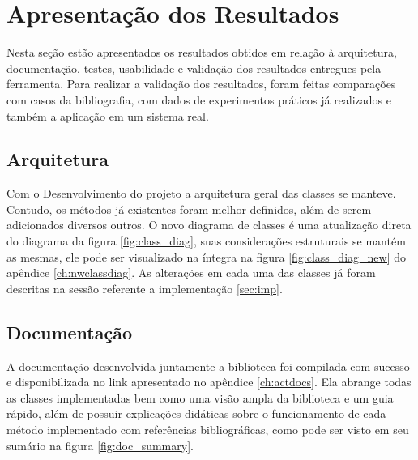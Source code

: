 \chapter{Apresentação dos Resultados}

Nesta seção estão apresentados os resultados obtidos em relação à arquitetura, documentação, testes, usabilidade e
validação dos resultados entregues pela ferramenta.
Para realizar a validação dos resultados, foram feitas comparações com casos da bibliografia, com dados de experimentos
práticos já realizados e também a aplicação em um sistema real.


\section{Arquitetura}
Com o Desenvolvimento do projeto a arquitetura geral das classes se manteve.
Contudo, os métodos já existentes foram melhor definidos, além de serem adicionados diversos outros.
O novo diagrama de classes é uma atualização direta do diagrama da figura \ref{fig:class_diag}, suas considerações
estruturais se mantém as mesmas, ele pode ser visualizado na íntegra na figura \ref{fig:class_diag_new}
do apêndice \ref{ch:nwclassdiag}.
As alterações em cada uma das classes já foram descritas na sessão referente a implementação \ref{sec:imp}.



\section{Documentação}

A documentação desenvolvida juntamente a biblioteca foi compilada com sucesso e disponibilizada no link apresentado
no apêndice \ref{ch:actdocs}.
Ela abrange todas as classes implementadas bem como uma visão ampla da biblioteca e um guia rápido, além de possuir
explicações didáticas sobre o funcionamento de cada método implementado com referências bibliográficas, como pode ser
visto em seu sumário na figura \ref{fig:doc_summary}.


